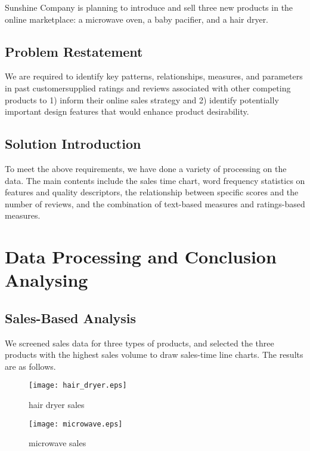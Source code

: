 \documentclass{mcmthesis}
\begin{document}
	Sunshine Company is planning to introduce and sell three new products in the online marketplace: a microwave oven, a baby pacifier, and a hair dryer.
	
	\subsection{Problem Restatement}
	
	We are required to  identify key patterns, relationships, measures, and parameters in past customersupplied ratings and reviews associated with other competing products to 1) inform their online sales strategy and 2) identify potentially important design features that would enhance product
	desirability. 
	
	\subsection{Solution Introduction}
	
	To meet the above requirements, we have done a variety of processing on the data. The main contents include the sales time chart, word frequency statistics on features and quality descriptors, the relationship between specific scores and the number of reviews, and the combination of  text-based measures and ratings-based measures.
	
	\section{Data Processing and Conclusion Analysing}
	
	\subsection{Sales-Based Analysis}
	We screened sales data for three types of products, and selected the three products with the highest sales volume to draw sales-time line charts. The results are as follows.
	
	\begin{figure}[H]
		\small
		\centering
		\texttt{[image: hair\_dryer.eps]}
		\caption{hair dryer sales} \label{hair dryer sales}
	\end{figure}
	
	\begin{figure}[H]
		\small
		\centering
		\texttt{[image: microwave.eps]}
		\caption{microwave sales} \label{microwave sales}
	\end{figure}
	
\end{document}
